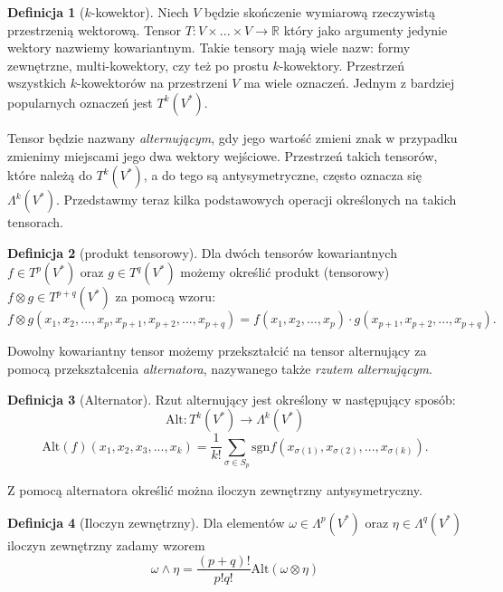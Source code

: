 \documentclass[licencjacka]{pracamgr}
\theoremstyle{definition}
\newtheorem{definition}{Definicja}[section]
\theoremstyle{definition}
\theoremstyle{plain}
\theoremstyle{plain}
\theoremstyle{plain}
\theoremstyle{plain}
\begin{document}
\begin{definition}[$k$-kowektor]
Niech $V$ będzie skończenie wymiarową rzeczywistą przestrzenią wektorową.
Tensor $T:V \times ... \times V \rightarrow \mathbb{R}$ 
który jako  argumenty jedynie wektory nazwiemy kowariantnym.
Takie tensory mają wiele nazw: formy zewnętrzne,
multi-kowektory, czy też po prostu $k$-kowektory.  Przestrzeń wszystkich
$k$-kowektorów na przestrzeni $V$ ma wiele oznaczeń.  Jednym z bardziej
popularnych oznaczeń jest $T^k (V^\ast)$. 
\end{definition}
Tensor będzie nazwany \emph{alternującym}, gdy jego wartość zmieni znak w
przypadku zmienimy miejscami jego dwa wektory wejściowe.  Przestrzeń takich
tensorów, które należą do $T^k (V^\ast)$, a do tego są antysymetryczne, często
oznacza się $\Lambda^k (V^\ast)$.  Przedstawmy teraz kilka podstawowych
operacji określonych na takich tensorach. \\

\begin{definition}[produkt tensorowy]
Dla dwóch tensorów kowariantnych $f \in T^p(V^\ast) $ oraz $g \in T^q(V^\ast) $
możemy określić produkt (tensorowy) $f \otimes g \in T^{p+q}(V^\ast) $ za
pomocą wzoru:
\[
  f \otimes g(x_1, x_2, ..., x_p, x_{p+1}, x_{p+2}, ... ,x_{p+q}) =
  f(x_1, x_2, ... , x_p) \cdot g(x_{p+1}, x_{p+2}, ... , x_{p+q}).
\] 
\end{definition}
Dowolny kowariantny tensor możemy
przekształcić na tensor alternujący za pomocą przekształcenia
\emph{alternatora}, nazywanego także \emph{rzutem alternującym}.


\begin{definition}[Alternator]
Rzut alternujący jest określony w następujący sposób:
\[
\text{Alt}:T^k (V^\ast) \rightarrow  \Lambda^k (V^\ast)
\]
\[
\text{Alt}(f)(x_1, x_2, x_3, ..., x_k) = \frac{1}{k!}
  \sum_{\sigma \in S_p}
     \text{sgn} f(x_{\sigma(1)}, x_{\sigma(2)}, ..., x_{\sigma(k)}).
\] 
\end{definition}

Z pomocą alternatora określić można iloczyn zewnętrzny antysymetryczny. 

\begin{definition}[Iloczyn zewnętrzny]
Dla elementów $\omega \in \Lambda^p (V^\ast)$ oraz 
$\eta \in \Lambda^q (V^\ast)$ iloczyn zewnętrzny zadamy wzorem
\[
  \omega \wedge \eta = \frac{(p+q)!}{p!q!} \text{Alt} (\omega \otimes \eta)
\] \\
\end{definition}
\end{document}
